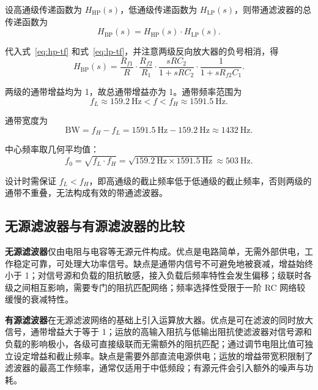 \documentclass[12pt]{ctexart}
\begin{document}
设高通级传递函数为 $H_{\mathrm{HP}}(s)$，低通级传递函数为 $H_{\mathrm{LP}}(s)$，则带通滤波器的总传递函数为
\begin{equation}
    H_{\mathrm{BP}}(s) = H_{\mathrm{HP}}(s) \cdot H_{\mathrm{LP}}(s).
\end{equation}

代入式~\eqref{eq:hp-tf} 和式~\eqref{eq:lp-tf}，并注意两级反向放大器的负号相消，得
\begin{equation}
    H_{\mathrm{BP}}(s)
    = \frac{R_{f1}}{R} \cdot \frac{R_{f2}}{R_1}
      \cdot \frac{sRC_2}{1 + sRC_2}
      \cdot \frac{1}{1 + sR_{f2}C_1}.
    \label{eq:bp-tf}
\end{equation}

两级的通带增益均为 1，故总通带增益亦为 1。通带频率范围为
\begin{equation}
    f_L \approx \SI{159.2}{\hertz} < f < f_H \approx \SI{1591.5}{\hertz}.
\end{equation}

通带宽度为
\begin{equation}
    \mathrm{BW} = f_H - f_L
               = \SI{1591.5}{\hertz} - \SI{159.2}{\hertz}
               \approx \SI{1432}{\hertz}.
\end{equation}

中心频率取几何平均值：
\begin{equation}
    f_0 = \sqrt{f_L \cdot f_H}
        = \sqrt{\SI{159.2}{\hertz} \times \SI{1591.5}{\hertz}}
        \approx \SI{503}{\hertz}.
\end{equation}

设计时需保证 $f_L < f_H$，即高通级的截止频率低于低通级的截止频率，否则两级的通带不重叠，无法构成有效的带通滤波器。

\subsection{无源滤波器与有源滤波器的比较}

\textbf{无源滤波器}仅由电阻与电容等无源元件构成。优点是电路简单，无需外部供电，工作稳定可靠，可处理大功率信号。缺点是通带内信号不可避免地被衰减，增益始终小于 1；对信号源和负载的阻抗敏感，接入负载后频率特性会发生偏移；级联时各级之间相互影响，需要专门的阻抗匹配网络；频率选择性受限于一阶 RC 网络较缓慢的衰减特性。

\textbf{有源滤波器}在无源滤波网络的基础上引入运算放大器。优点是可在滤波的同时放大信号，通带增益大于等于 1；运放的高输入阻抗与低输出阻抗使滤波器对信号源和负载的影响极小，各级可直接级联而无需额外的阻抗匹配；通过调节电阻比值可独立设定增益和截止频率。缺点是需要外部直流电源供电；运放的增益带宽积限制了滤波器的最高工作频率，通常仅适用于中低频段；有源元件会引入额外的噪声与功耗。
\end{document}
